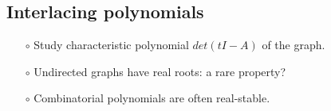 \documentclass[20pt, a1paper, portrait, margin=0mm, innermargin=10mm,
     blockverticalspace=8mm, colspace=10mm, subcolspace=8mm]{tikzposter}
\theoremstyle{break}
\begin{document}
{\begin{minipage}[t]{0.25\textwidth}
      \subsection*{Interlacing polynomials}
      \begin{itemize}
          \item[$\circ$] Study characteristic polynomial $det(tI - A)$ of the graph.
          \item[$\circ$] Undirected graphs have real roots: a rare property?
          \item[$\circ$] Combinatorial polynomials are often real-stable.
      \end{itemize}
  \end{minipage}
}
\end{document}
